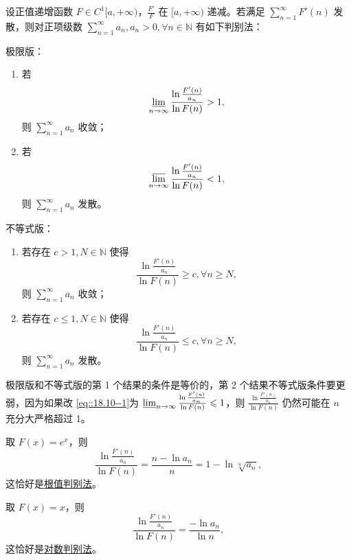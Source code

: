 \documentclass[../../main.tex]{subfiles}%
\begin{document}
\begin{theorem}[Cauchy链]\label{theorem:Cauchy链}
设正值递增函数 \( F \in C^1[a, +\infty) \)，\(\frac{F'}{F}\) 在 \([a, +\infty)\) 递减。若满足 \(\sum_{n=1}^\infty F'(n)\) 发散，则对正项级数 \(\sum_{n=1}^\infty a_n, a_n > 0, \forall n \in \mathbb{N}\) 有如下判别法：

极限版：
\begin{enumerate}
\item 若
\begin{align}
\varliminf_{n \to \infty} \frac{\ln \frac{F'(n)}{a_n}}{\ln F(n)} > 1, \label{eq::18.9--1}
\end{align}
则 \(\sum_{n=1}^\infty a_n\) 收敛；

\item 若
\begin{align}
\varlimsup_{n \to \infty} \frac{\ln \frac{F'(n)}{a_n}}{\ln F(n)} < 1, \label{eq::18.10--1}
\end{align}
则 \(\sum_{n=1}^\infty a_n\) 发散。
\end{enumerate}

不等式版：
\begin{enumerate}
\item 若存在 \( c > 1, N \in \mathbb{N} \) 使得
\[
\frac{\ln \frac{F'(n)}{a_n}}{\ln F(n)} \geqslant c, \forall n \geqslant N,
\]
则 \(\sum_{n=1}^\infty a_n\) 收敛；

\item 若存在 \( c \leqslant 1, N \in \mathbb{N} \) 使得
\[
\frac{\ln \frac{F'(n)}{a_n}}{\ln F(n)} \leqslant c, \forall n \geqslant N,
\]
则 \(\sum_{n=1}^\infty a_n\) 发散。
\end{enumerate}
\end{theorem}
\begin{note}
极限版和不等式版的第 1 个结果的条件是等价的，第 2 个结果不等式版条件要更弱，因为如果改 \eqref{eq::18.10--1}为 \(\varliminf_{n \to \infty} \frac{\ln \frac{F'(n)}{a_n}}{\ln F(n)} \leqslant 1\)，则 \(\frac{\ln \frac{F'(n)}{a_n}}{\ln F(n)}\) 仍然可能在 \( n \) 充分大严格超过 1。
\end{note}
\begin{remark}
取 \( F(x) = e^x \)，则
\[
\frac{\ln \frac{F'(n)}{a_n}}{\ln F(n)} = \frac{n - \ln a_n}{n} = 1 - \ln \sqrt[n]{a_n},
\]
这恰好是\hyperref[theorem:级数-根值判别法]{根值判别法}。

取 \( F(x) = x \)，则
\[
\frac{\ln \frac{F'(n)}{a_n}}{\ln F(n)} = \frac{-\ln a_n}{\ln n},
\]
这恰好是\hyperref[theorem:级数-对数判别法]{对数判别法}。
\end{remark}
\end{document}
